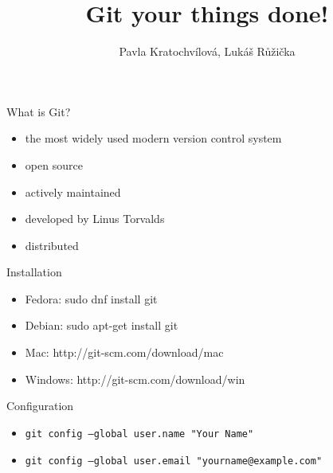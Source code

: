\documentclass[14pt]{beamer}
\begin{document}
	\author{Pavla Kratochvílová, Lukáš Růžička}
	\title{Git your things done!}
	\begin{frame}[plain]
		\maketitle
	\end{frame}
	
	\begin{frame}{What is Git?}
		\begin{itemize}
		\item the most widely used modern version control system
		\item open source
		\item actively maintained
		\item developed by Linus Torvalds
		\item distributed 
		\end{itemize}
	\end{frame}

	\begin{frame}{Installation}
		\begin{itemize}
		\item Fedora: sudo dnf install git
		\item Debian: sudo apt-get install git
		\item Mac: http://git-scm.com/download/mac
		\item Windows: http://git-scm.com/download/win
		\end{itemize}
	\end{frame}

	\begin{frame}{Configuration}
		\begin{itemize}
		\item \texttt{git config --global user.name "Your Name"}
		\item \texttt{git config --global user.email "yourname@example.com"}
		\end{itemize}
	\end{frame}
\end{document}
